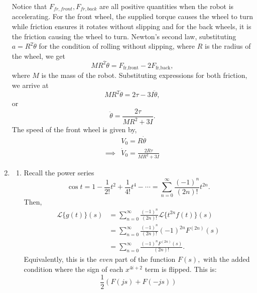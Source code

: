 \documentclass{article}
\numberwithin{equation}{section}
\begin{document}
\begin{enumerate}[label=\textbf{1.\arabic*}]
    Notice that $F_{fr,front},F_{fr,back}$ are all positive quantities when the robot is accelerating. For the front wheel, the supplied torque causes the wheel to turn while friction ensures it rotates without slipping and for the back wheels, it is the friction causing the wheel to turn. Newton's second law, substituting $a=R^2\ddot{\theta}$ for the condition of rolling without slipping, where $R$ is the radius of the wheel, we get 
    \begin{equation}
        MR^2\ddot{\theta} = F_{\text{fr,front}} - 2F_{\text{fr,back}},
    \end{equation}
    where $M$ is the mass of the robot. Substituting expressions for both friction, we arrive at 
    \begin{equation}
        MR^2\ddot{\theta} = 2\tau - 3I\ddot{\theta},
    \end{equation}
    or 
    \begin{equation}
        \ddot{\theta} = \frac{2\tau}{MR^2+3I}.
    \end{equation}
    The speed of the front wheel is given by,
    \begin{align}
        &V_0 = R\dot{\theta} \\ 
        \implies &\boxed{ \dot{V}_0 =\frac{2R\tau}{MR^2+3I}}
    \end{align}
    \item \begin{enumerate}[label=(\alph*)]
        \item Recall the power series
        \begin{equation}
            \cos t = 1 - \frac{1}{2!}t^2 + \frac{1}{4!}t^4 - \cdots = \sum_{n=0}^{\infty} \frac{(-1)^n}{(2n)!}t^{2n}.
        \end{equation}
        Then,
        \begin{align}
            \mathcal{L}\{g(t)\}(s) &= \sum_{n=0}^{\infty} \frac{(-1)^n}{(2n)!} \mathcal{L}\{t^{2n}f(t)\}(s) \\ 
            &= \sum_{n=0}^{\infty} \frac{(-1)^n}{(2n)!} (-1)^{2n} F^{(2n)}(s) \\ 
            &= \sum_{n=0}^{\infty} \frac{(-1)^n F^{(2n)}(s)}{(2n)!}.
        \end{align}
        Equivalently, this is the \textit{even} part of the function $F(s),$ with the added condition where the sign of each $x^{4i+2}$ term is flipped. This is:
        \begin{equation}
           \boxed{ \frac{1}{2}\left(F(js)+F(-js)\right)}
        \end{equation}

\end{enumerate}
\end{enumerate}
\end{document}
